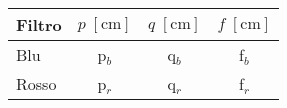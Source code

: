\begin{table}[H]
    \centering
    \small
    \begin{tabular}{l c c c}
        \toprule
		Filtro & $p \; [\si{\centi\metre}]$ & $q \; [\si{\centi\metre}]$ & $f \; [\si{\centi\metre}]$ \\
        \midrule
		Blu & p$_b$ & q$_b$ & f$_b$ \\
		Rosso & p$_r$ & q$_r$ & f$_r$ \\
        \bottomrule
    \end{tabular}
\end{table}
